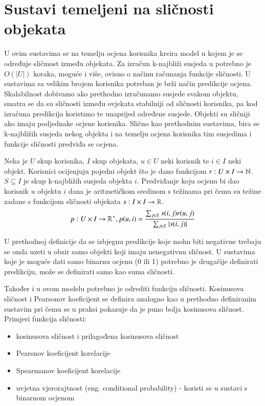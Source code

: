 \documentclass[a4paper,oneside,12pt]{memoir} %
\begin{document}
\section{Sustavi temeljeni na sličnosti objekata}
%
U ovim sustavima se na temelju ocjena korisnika kreira model u kojem je se određuje sličmost između objekata. Za izračun k-najbliži susjeda u potrebno je $O(|U|)$ koraka, moguće i više, ovisno o načinu računanja funkcije sličnosti. U sustavima sa velikim brojem korisnika potreban je brži način predikcije ocjena. Skalabilnost dobivamo ako prethodno izračunamo susjede svakom objektu, smatra se da su sličnosti između ovjekata stabilniji od sličnosti korisnika, pa kod izračuna predikcija koristimo te unaprijed određene susjede. Objekti su sličniji ako imaju podjednake ocjene korisnika. Slično kao prethodnim sustavima, bira se k-najbližih susjeda nekog objekta i na temelju ocjena korisnika tim susjedima i funkcije sličnosti predviđa se ocjena.
\begin{defn}
Neka je $U$ skup korisnika, $I$ skup objekata, $u\in U$ neki korisnik te $i\in I$ neki objekt. Korisnici ocijenjuju pojedni objekt što je dano funkcijom $r:U\times I \rightarrow \mathbb{N}$. $S \subseteq I$ je skup k-najbližih susjeda objekta $i$. Predviđanje koju ocjenu bi dao korisnik $u$ objektu $i$ dana je aritmetičkom sredinom s težinama pri čemu su težine zadane s funkcijom sličnosti objekata $s:I\times I\rightarrow \mathbb{R}$. 
\[ p:U\times I \rightarrow \mathbb{R}^+, p(u,i) = \frac{\sum_{j\in S}s(i,j)r(u,j)}{\sum_{j\in S}|s(i,j)|} \]
\end{defn}
\begin{rem}
U prethodnoj definicije da se izbjegnu predikcije koje mohu biti negativne trebaju se onda uzeti u obzir samo objekti koji imaju nenegativnu sličnost. U sustavima koje je moguće dati samo binarnu ocjenu (0 ili 1) potrebno je drugačije definirati predikciju, može se definirati samo kao suma sličnosti.
\end{rem}
Također i u ovom modelu potrebno je odrediti funkciju sličnosti. Kosinusova sličnost i Pearsonov koeficijent se definira analogno kao u prethodno definiranim sustavim pri čemu se u praksi pokazuje da je puno bolja kosinusova sličnost.
\bigskip
\\Primjeri funkcija sličnosti:
\begin{itemize}[topsep=2pt]
\setlength{\parskip}{0pt}
\item kosinusova sličnost i prilagođena kosinusova sličnost
\item Pearsnov koeficijent korelacije 
\item Spearmanov koeficijent korelacije 
\item uvjetna vjerorajtnost (eng. conditional probability) - koristi se u sustavi s binarnom ocjenom
\end{itemize}
\end{document}
